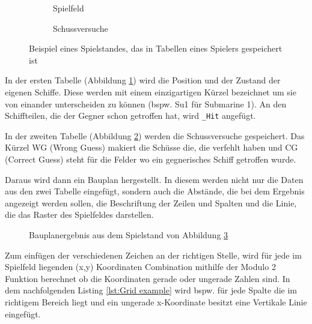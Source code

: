 \documentclass{article}
\begin{document}
\begin{figure}[H]
    \begin{subfigure}{0.50\textwidth}
    \centering
    
    \caption{Spielfeld}
    \label{fig:board}
    \end{subfigure}
    \begin{subfigure}{0.50\textwidth}
    \centering
    
    \caption{Schussversuche}
    \label{fig:guesses}
\end{subfigure}
\caption{Beispiel eines Spielstandes, das in Tabellen eines Spielers gespeichert ist}
\label{fig:Boards}
\end{figure}

\par
    In der ersten Tabelle (Abbildung \ref{fig:board}) wird die Position und der Zustand der eigenen Schiffe. Diese werden mit einem einzigartigen Kürzel bezeichnet um sie von einander unterscheiden zu können (bspw. Su1 für Submarine 1). An den Schiffteilen, die der Gegner schon getroffen hat, wird \verb$_Hit$ angefügt.
\par
    In der zweiten Tabelle (Abbildung \ref{fig:guesses}) werden die Schussversuche gespeichert. Das Kürzel WG (Wrong Guess) makiert die Schüsse die, die verfehlt haben und CG (Correct Guess) steht für die Felder wo ein gegnerisches Schiff getroffen wurde.\newline

\par
    Daraus wird dann ein Bauplan hergestellt. In diesem werden nicht nur die Daten aus den zwei Tabelle eingefügt, sondern auch die Abstände, die bei dem Ergebnis angezeigt werden sollen, die Beschriftung der Zeilen und Spalten und die Linie, die das Raster des Spielfeldes darstellen.

\begin{figure}[H]
    \centering
    
    \caption{Bauplanergebnis aus dem Spielstand von Abbildung \ref{fig:Boards}}
    \label{fig:blueprint}
\end{figure}

\par
    Zum einfügen der verschiedenen Zeichen an der richtigen Stelle, wird für jede im Spielfeld liegenden (x,y) Koordinaten Combination mithilfe der Modulo 2 Funktion berechnet ob die Koordinaten gerade oder ungerade Zahlen sind. In dem nachfolgenden Listing \ref{lst:Grid example} wird bspw. für jede Spalte die im richtigem Bereich liegt und ein ungerade x-Koordinate besitzt eine Vertikale Linie eingefügt.
\end{document}
